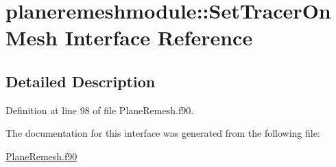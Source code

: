 \hypertarget{interfaceplaneremeshmodule_1_1SetTracerOnMesh}{\section{planeremeshmodule\+:\+:Set\+Tracer\+On\+Mesh Interface Reference}
\label{interfaceplaneremeshmodule_1_1SetTracerOnMesh}
}


\subsection{Detailed Description}


Definition at line 98 of file Plane\+Remesh.\+f90.



The documentation for this interface was generated from the following file\+:\begin{DoxyCompactItemize}
\item 
\hyperlink{PlaneRemesh_8f90}{Plane\+Remesh.\+f90}\end{DoxyCompactItemize}
